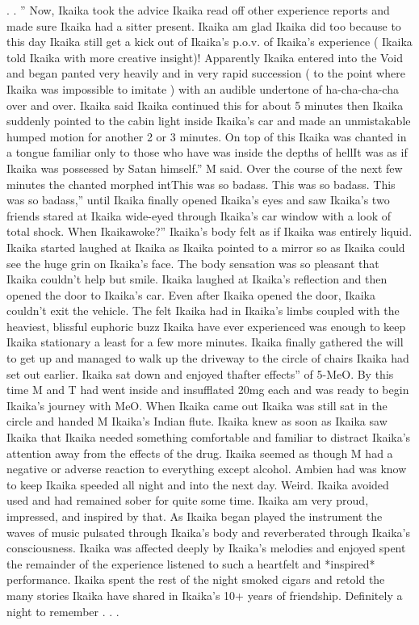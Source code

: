 \documentclass[12pt]{book}
\begin{document}
. . '' Now, Ikaika took the advice Ikaika read off other experience reports and made sure Ikaika had a sitter present. Ikaika am glad Ikaika did too because to this day Ikaika still get a kick out of Ikaika's p.o.v. of Ikaika's experience ( Ikaika told Ikaika with more creative insight)! Apparently Ikaika entered into the Void and began panted very heavily and in very rapid succession ( to the point where Ikaika was impossible to imitate ) with an audible undertone of ha-cha-cha-cha over and over. Ikaika said Ikaika continued this for about 5 minutes then Ikaika suddenly pointed to the cabin light inside Ikaika's car and made an unmistakable humped motion for another 2 or 3 minutes. On top of this Ikaika was chanted in a tongue familiar only to those who have was inside the depths of hellIt was as if Ikaika was possessed by Satan himself.'' M said. Over the course of the next few minutes the chanted morphed intThis was so badass. This was so badass. This was so badass,'' until Ikaika finally opened Ikaika's eyes and saw Ikaika's two friends stared at Ikaika wide-eyed through Ikaika's car window with a look of total shock. When Ikaikawoke?'' Ikaika's body felt as if Ikaika was entirely liquid. Ikaika started laughed at Ikaika as Ikaika pointed to a mirror so as Ikaika could see the huge grin on Ikaika's face. The body sensation was so pleasant that Ikaika couldn't help but smile. Ikaika laughed at Ikaika's reflection and then opened the door to Ikaika's car. Even after Ikaika opened the door, Ikaika couldn't exit the vehicle. The felt Ikaika had in Ikaika's limbs coupled with the heaviest, blissful euphoric buzz Ikaika have ever experienced was enough to keep Ikaika stationary a least for a few more minutes. Ikaika finally gathered the will to get up and managed to walk up the driveway to the circle of chairs Ikaika had set out earlier. Ikaika sat down and enjoyed thafter effects'' of 5-MeO. By this time M and T had went inside and insufflated 20mg each and was ready to begin Ikaika's journey with MeO. When Ikaika came out Ikaika was still sat in the circle and handed M Ikaika's Indian flute. Ikaika knew as soon as Ikaika saw Ikaika that Ikaika needed something comfortable and familiar to distract Ikaika's attention away from the effects of the drug. Ikaika seemed as though M had a negative or adverse reaction to everything except alcohol. Ambien had was know to keep Ikaika speeded all night and into the next day. Weird. Ikaika avoided used and had remained sober for quite some time. Ikaika am very proud, impressed, and inspired by that. As Ikaika began played the instrument the waves of music pulsated through Ikaika's body and reverberated through Ikaika's consciousness. Ikaika was affected deeply by Ikaika's melodies and enjoyed spent the remainder of the experience listened to such a heartfelt and *inspired* performance. Ikaika spent the rest of the night smoked cigars and retold the many stories Ikaika have shared in Ikaika's 10+ years of friendship. Definitely a night to remember . . . 
\end{document}
